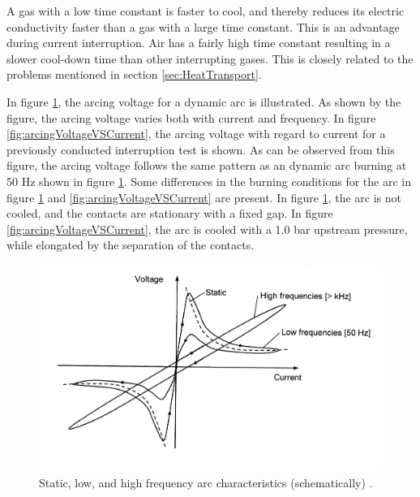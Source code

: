 \documentclass[10pt,b5paper,twoside]{article}
\begin{document}
A gas with a low time constant is faster to cool, and thereby reduces its electric conductivity faster than a gas with a large time constant. This is an advantage during current interruption. Air has a fairly high time constant resulting in a slower cool-down time than other interrupting gases. This is closely related to the problems mentioned in section \ref{sec:HeatTransport}. 

In figure \ref{fig:arcingVoltageFre}, the arcing voltage for a dynamic arc is illustrated. As shown by the figure, the arcing voltage varies both with current and frequency. In figure \ref{fig:arcingVoltageVSCurrent}, the arcing voltage with regard to current for a previously conducted interruption test is shown. As can be observed from this figure, the arcing voltage follows the same pattern as an dynamic arc burning at 50 Hz shown in figure \ref{fig:arcingVoltageFre}. Some differences in the burning conditions for the arc in figure \ref{fig:arcingVoltageFre} and \ref{fig:arcingVoltageVSCurrent} are present. In figure \ref{fig:arcingVoltageFre}, the arc is not cooled, and the contacts are stationary with a fixed gap. In figure \ref{fig:arcingVoltageVSCurrent}, the arc is cooled with a 1.0 bar upstream pressure, while elongated by the separation of the contacts.

\begin{figure}[H]
\centering
\includegraphics[scale=1]{Bilder/Theory/dynamicArcingVoltage.png}
\caption{Static, low, and high frequency arc characteristics (schematically) \cite{bib:HVEbreak}.} \label{fig:arcingVoltageFre}
\end{figure}
\end{document}
